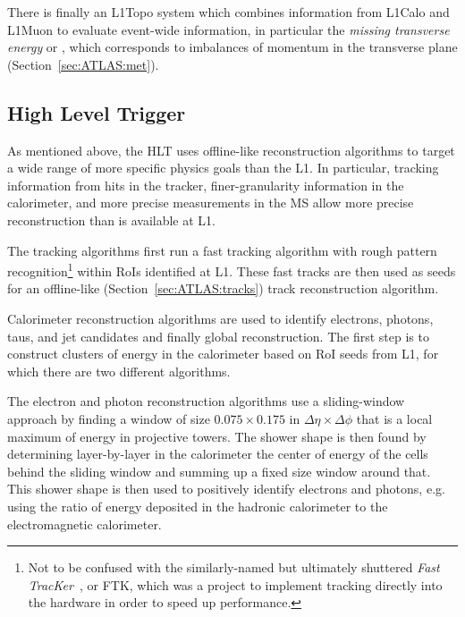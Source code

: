 There is finally an L1Topo system which combines information from L1Calo and L1Muon to evaluate event-wide information, in particular the \textit{missing transverse energy} or \Etmiss{}, which corresponds to imbalances of momentum in the transverse plane (Section~\ref{sec:ATLAS:met}).

\subsection{High Level Trigger}
\label{sec:ATLAS:HLT}

As mentioned above, the HLT uses offline-like reconstruction algorithms to target a wide range of more specific physics goals than the L1.
In particular, tracking information from hits in the tracker, finer-granularity information in the calorimeter, and more precise measurements in the MS allow more precise reconstruction than is available at L1.

The tracking algorithms first run a fast tracking algorithm with rough pattern recognition\footnote{Not to be confused with the similarly-named but ultimately shuttered \textit{Fast TracKer}~\cite{Shochet:1552953}, or FTK, which was a project to implement tracking directly into the hardware in order to speed up performance.} within RoIs identified at L1.
These fast tracks are then used as seeds for an offline-like (Section~\ref{sec:ATLAS:tracks}) track reconstruction algorithm.

Calorimeter reconstruction algorithms are used to identify electrons, photons, taus, and jet candidates and finally \etmiss{} global reconstruction.
The first step is to construct clusters of energy in the calorimeter based on RoI seeds from L1, for which there are two different algorithms.

The electron and photon reconstruction algorithms use a sliding-window approach by finding a window of size $0.075 \times 0.175$ in $\Delta\eta \times \Delta\phi$ that is a local maximum of energy in projective towers.
The shower shape is then found by determining layer-by-layer in the calorimeter the center of energy of the cells behind the sliding window and summing up a fixed size window around that.
This shower shape is then used to positively identify electrons and photons, e.g. using the ratio of energy deposited in the hadronic calorimeter to the electromagnetic calorimeter.

